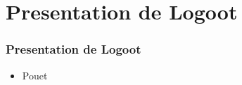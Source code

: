 \section{Presentation de Logoot}
  \begin{frame}
    \frametitle{Presentation de Logoot}
    \begin{itemize}
      \item Pouet
    \end{itemize}
  \end{frame}

